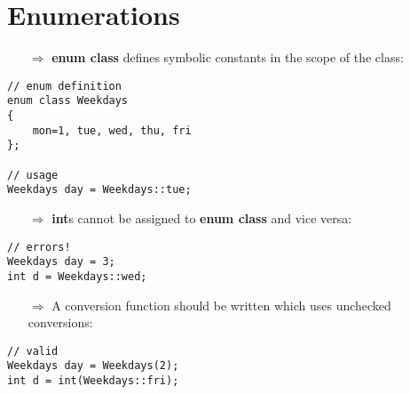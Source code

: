 \documentclass[10pt]{article}
\begin{document}
\section{Enumerations}
\small
\begin{enumerate}
\item[$\Rightarrow$] \textbf{enum class} defines symbolic constants in the scope of the class:
\end{enumerate}
\begin{lstlisting}
// enum definition
enum class Weekdays
{
    mon=1, tue, wed, thu, fri
};

// usage
Weekdays day = Weekdays::tue;
\end{lstlisting}
\begin{enumerate}
\item[$\Rightarrow$] \textbf{int}s cannot be assigned to \textbf{enum class} and vice versa:
\end{enumerate}
\begin{lstlisting}
// errors!
Weekdays day = 3;
int d = Weekdays::wed;
\end{lstlisting}
\begin{enumerate}
\item[$\Rightarrow$] A conversion function should be written which uses unchecked conversions:
\end{enumerate}
\begin{lstlisting}
// valid
Weekdays day = Weekdays(2);
int d = int(Weekdays::fri);
\end{lstlisting}
%
%
\end{document}
